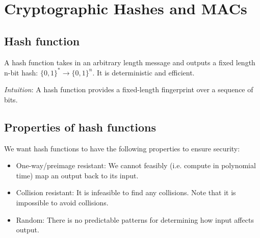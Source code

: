 \chapter{Cryptographic Hashes and MACs}

\section{Hash function}
A hash function takes in an arbitrary length message and outputs a fixed length n-bit hash: $\{0, 1\}^* \rightarrow \{0, 1\}^n$. It is deterministic and efficient.

\medskip
 
 \emph{Intuition}: A hash function provides a fixed-length fingerprint over a sequence of bits.
 
\section{Properties of hash functions}
 We want hash functions to have the following properties to ensure security:
 \begin{itemize}
     \item One-way/preimage resistant: We cannot feasibly (i.e. compute in polynomial time) map an output back to its input.
     \item Collision resistant: It is infeasible to find any collisions. Note that it is impossible to avoid collisions.
     \item Random: There is no predictable patterns for determining how input affects output.
 \end{itemize}
 
 